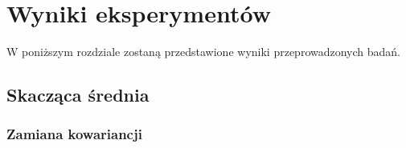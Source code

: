 \section{Wyniki eksperymentów}
W poniższym rozdziale zostaną przedstawione wyniki przeprowadzonych badań.
\subsection{Skacząca średnia}

\subsubsection{Zamiana kowariancji}

